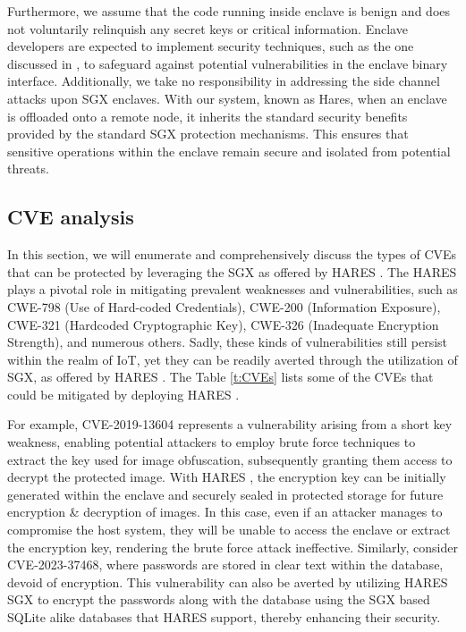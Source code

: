 \documentclass[article, doublespace,nopageskip]{VTthesis} %
\newcommand{\monitor}{HARES }
\begin{document}
    Furthermore, we assume that the code running inside enclave is benign and does not voluntarily relinquish any secret keys or critical information. Enclave developers are expected to implement security techniques, such as the one discussed in \cite{Protecting, SGX-Defense}, to safeguard against potential vulnerabilities in the enclave binary interface. Additionally, we take no responsibility in addressing the side channel attacks upon SGX enclaves. With our system, known as Hares, when an enclave is offloaded onto a remote node, it inherits the standard security benefits provided by the standard SGX protection mechanisms. This ensures that sensitive operations within the enclave remain secure and isolated from potential threats.

    \subsection{CVE analysis} \label{cve analysis}
    In this section, we will enumerate and comprehensively discuss the types of CVEs that can be protected by leveraging the SGX as offered by \monitor. The \monitor plays a pivotal role in mitigating prevalent weaknesses and vulnerabilities, such as CWE-798 (Use of Hard-coded Credentials), CWE-200 (Information Exposure), CWE-321 (Hardcoded Cryptographic Key), CWE-326 (Inadequate Encryption Strength), and numerous others. Sadly, these kinds of vulnerabilities still persist within the realm of IoT, yet they can be readily averted through the utilization of SGX, as offered by \monitor. The Table \ref{t:CVEs} lists some of the CVEs that could be mitigated by deploying \monitor.

    For example, CVE-2019-13604 represents a vulnerability arising from a short key weakness, enabling potential attackers to employ brute force techniques to extract the key used for image obfuscation, subsequently granting them access to decrypt the protected image. With \monitor, the encryption key can be initially generated within the enclave and securely sealed in protected storage for future encryption \& decryption of images. In this case, even if an attacker manages to compromise the host system, they will be unable to access the enclave or extract the encryption key, rendering the brute force attack ineffective. Similarly, consider CVE-2023-37468, where passwords are stored in clear text within the database, devoid of encryption. This vulnerability can also be averted by utilizing \monitor SGX to encrypt the passwords along with the database using the SGX based SQLite alike databases that \monitor support, thereby enhancing their security.
\end{document}
